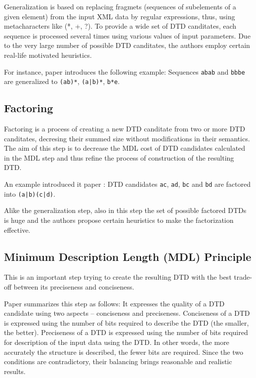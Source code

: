 Generalization is based on replacing fragmets (sequences of subelements of a given element) from the input XML data by regular expressions, thus, using metacharacters like (*, +, ?). To provide a wide set of DTD canditates, each sequence is processed several times using various values of input parameters. Due to the very large number of possible DTD canditates, the authors employ certain real-life motivated heuristics.

For instance, paper \cite{Garofalakis:2000:XSE:342009.335409} introduces the following example: Sequences \texttt{abab} and \texttt{bbbe} are generalized to \texttt{(ab)*}, \texttt{(a|b)*}, \texttt{b*e}.

\subsection{Factoring}
Factoring is a process of creating a new DTD canditate from two or more DTD canditates, decresing their summed size without modifications in their semantics. The aim of this step is to decrease the MDL cost of DTD candidates calculated in the MDL step and thus refine the process of construction of the resulting DTD.

An example introduced it paper \cite{Garofalakis:2000:XSE:342009.335409}: DTD candidates \texttt{ac}, \texttt{ad}, \texttt{bc} and \texttt{bd} are factored into \texttt{(a|b)(c|d)}.

Alike the generalization step, also in this step the set of possible factored DTDs is huge and the authors propose certain heuristics to make the factorization effective.

\subsection{Minimum Description Length (MDL) Principle}
This is an important step trying to create the resulting DTD with the best trade-off between its preciseness and conciseness.  

Paper \cite{Mlynkova:2008:AAX:1494650.1495496} summarizes this step as follows: It expresses the quality of a DTD candidate using two aspects – conciseness and preciseness. Conciseness of a DTD is expressed using the number of bits required to describe the DTD (the smaller, the better). Preciseness of a DTD is expressed using the number of bits required for description of the input data using the DTD. In other words, the more accurately the structure is described, the fewer bits are required. Since the two conditions are contradictory, their balancing brings reasonable and realistic results.

